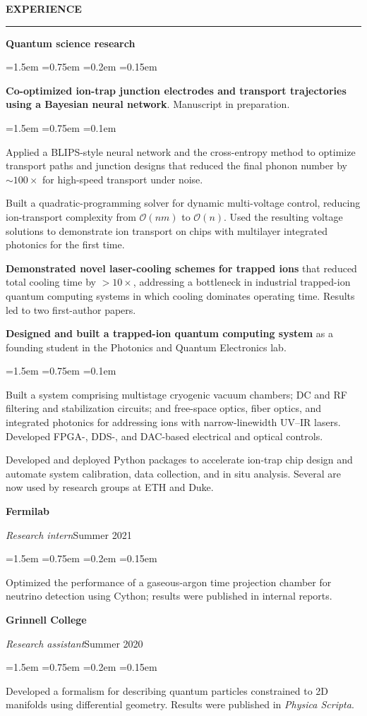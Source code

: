 \documentclass{article}
\newenvironment{rSection}[1]{%
  \smallskip
  \MakeUppercase{\textbf{#1}}
  \smallskip
  \hrule
  \begin{list}{}{%
    \setlength{\leftmargin}{0em}
    \setlength{\topsep}{0.25em}
    \setlength{\partopsep}{0pt}
    \setlength{\parsep}{0pt}
    \setlength{\itemsep}{0.15em}
  }
  \item[]
}{%
  \end{list}
}
\newcommand{\institution}[1]{%
  {\fontsize{11}{13}\selectfont\textbf{#1}}\par\vspace{-0.1em}%
}
\newcommand{\role}[2]{%
  \textit{#1}\hfill #2\par\vspace{-0.3em}%
}
\newcommand{\category}[1]{%
  \vspace{0.2em}\textbf{#1}\par\vspace{-0.2em}%
}
\newenvironment{experienceItems}{%
  \begin{list}{\makebox[0pt][c]{$\cdot$}}{%
    \leftmargin=1.5em
    \labelwidth=0pt
    \labelsep=0.75em
    \topsep=0.2em
    \partopsep=0pt
    \parsep=0pt
    \itemsep=0.15em
  }
}{%
  \end{list}
  \vspace{0.2em}
}
\newenvironment{details}{%
  \begin{list}{\makebox[0pt][c]{$\cdot$}}{%
    \leftmargin=1.5em
    \labelwidth=0pt
    \labelsep=0.75em
    \topsep=0.1em
    \partopsep=0pt
    \parsep=0pt
    \itemsep=0pt
  }
}{%
  \end{list}
}
\begin{document}
\begin{rSection}{Experience}
\category{Quantum science research}
\begin{experienceItems}
\item \textbf{Co-optimized ion-trap junction electrodes and transport trajectories using a Bayesian neural network}. Manuscript in preparation.
\begin{details}
    \item Applied a BLIPS-style neural network and the cross-entropy method to optimize transport paths and junction designs that reduced the final phonon number by $\sim\!100\times$ for high-speed transport under noise.
    \item Built a quadratic-programming solver for dynamic multi-voltage control, reducing ion-transport complexity from $\mathcal{O}(nm)$ to $\mathcal{O}(n)$. Used the resulting voltage solutions to demonstrate ion transport on chips with multilayer integrated photonics for the first time.
\end{details}
\item \textbf{Demonstrated novel laser-cooling schemes for trapped ions} that reduced total cooling time by $>\!10\times$, addressing a bottleneck in industrial trapped-ion quantum computing systems in which cooling dominates operating time. Results led to two first-author papers.
\item \textbf{Designed and built a trapped-ion quantum computing system} as a founding student in the Photonics and Quantum Electronics lab.
\begin{details}
\item Built a system comprising multistage cryogenic vacuum chambers; DC and RF filtering and stabilization circuits; and free-space optics, fiber optics, and integrated photonics for addressing ions with narrow-linewidth UV--IR lasers. Developed FPGA-, DDS-, and DAC-based electrical and optical controls.
\item Developed and deployed Python packages to accelerate ion-trap chip design and automate system calibration, data collection, and in situ analysis. Several are now used by research groups at ETH and Duke.
\end{details}
\end{experienceItems}

\institution{Fermilab}
\role{Research intern}{Summer 2021}
\begin{experienceItems}
\item Optimized the performance of a gaseous-argon time projection chamber for neutrino detection using Cython; results were published in internal reports.
\end{experienceItems}

\institution{Grinnell College}
\role{Research assistant}{Summer 2020}
\begin{experienceItems}
\item Developed a formalism for describing quantum particles constrained to 2D manifolds using differential geometry. Results were published in \textit{Physica Scripta}.
\end{experienceItems}




\end{rSection}
\end{document}
